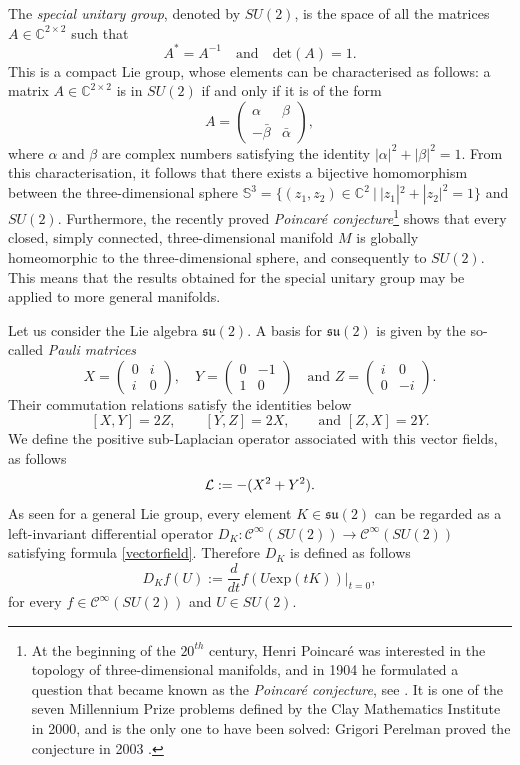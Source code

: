 \documentclass[12pt,oneside,a4paper]{book}
\numberwithin{equation}{section}     %
\theoremstyle{plain}
\theoremstyle{definition}
\newcommand{\C}{{\mathbb C}}
\newcommand{\slp}{{\mathcal L}}
\begin{document}
The \textit{special unitary group}, denoted by $SU(2)$, is the space of all the matrices $A\in\C^{2\times 2}$ such that
\[
A^*=A^{-1}\quad\text{and}\quad\text{det}(A)=1.
\]
This is a compact Lie group, whose elements can be characterised as follows: a matrix $A\in\C^{2\times2}$ is in $SU(2)$ if and only if it is of the form
\[
A=
\begin{pmatrix}
\alpha & \beta\\
-\bar{\beta} & \bar{\alpha}
\end{pmatrix},
\]
where $\alpha$ and $\beta$ are complex numbers satisfying the identity $|\alpha|^2+|\beta|^2=1$.
From this characterisation, it follows that there exists a bijective homomorphism between the three-dimensional sphere $\mathbb{S}^3=\{(z_1,z_2)\in\C^2~|~|z_1|^2+|z_2|^2=1\}$ and $SU(2)$. Furthermore, the recently proved \textit{Poincar\'e conjecture}\footnote{At the beginning of the $20^{th}$ century, Henri Poincar\'e was interested in the topology of three-dimensional manifolds, and in 1904 he formulated a question that became known as the \textit{Poincar\'e conjecture}, see \cite[pp. 498 and 370]{Poincare}. It is one of the seven Millennium Prize problems defined by the Clay Mathematics Institute in 2000, and is the only one to have been solved: Grigori Perelman proved the conjecture in 2003 \cite{Perelman1,Perelman2,Perelman3}.} shows that every closed, simply connected, three-dimensional manifold $M$ is globally homeomorphic to the three-dimensional sphere, and consequently to $SU(2)$. This means that the results obtained for the special unitary group may be applied to more general manifolds. 

Let us consider the Lie algebra $\mathfrak{su}(2)$. A basis for $\mathfrak{su}(2)$ is given by the so-called \textit{Pauli matrices}
\[
X=\begin{pmatrix}
0 & i\\
i & 0
\end{pmatrix}, \quad
Y=\begin{pmatrix}
0 & -1\\
1 & 0
\end{pmatrix}\quad\text{and }
Z=\begin{pmatrix}
i & 0\\
0 & -i
\end{pmatrix}.
\]
Their commutation relations satisfy the identities below 
\[
[X,Y]=2Z,\qquad[Y,Z]=2X,\qquad\text{and }[Z,X]=2Y.
\]
We define the positive sub-Laplacian operator associated with this vector fields, as follows
\begin{equation}\notag
\slp:=-(X^2+Y^2).
\end{equation}
As seen for a general Lie group, every element $K\in\mathfrak{su}(2)$ can be regarded  as a left-invariant differential operator $D_K:\mathcal{C}^\infty(SU(2))\rightarrow\mathcal{C}^\infty(SU(2))$ satisfying formula  \eqref{vectorfield}. Therefore $D_K$ is defined as follows
\[
D_Kf(U):=\frac{d}{dt}f(U\text{exp}(tK))\big |_{t=0},
\] 
for every $f\in \mathcal{C}^\infty(SU(2))$ and  $U\in SU(2)$. 
\end{document}
